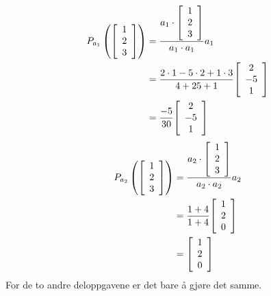 \documentclass[11pt, a4paper, norsk]{NTNUoving}
\newenvironment{pkt}{\begin{punkt}}{\end{punkt}}
\newenvironment{matrise}[1][c]{
        \left[
            \begin{array}{#1}
    }
    {    
    \end{array}
    \right]           
}
\begin{document}
\begin{oppgave}
    \begin{pkt}
        \begin{align*}
            P_{a_1}\left(\begin{matrise}
            1\\2\\3
            \end{matrise}\right)&=\frac{a_1\cdot \begin{matrise}
            1\\2\\3
            \end{matrise}}{a_1\cdot a_1}a_1
            \\&= \frac{2\cdot 1 - 5 \cdot 2 + 1 \cdot 3}{4+25+1}\begin{matrise}
                2\\-5\\1
            \end{matrise}
            \\&=\frac{-5}{30}\begin{matrise}
                2\\-5\\1
            \end{matrise}
        \end{align*}
        \begin{align*}
            P_{a_2}\left(\begin{matrise}
            1\\2\\3
            \end{matrise}\right)&=\frac{a_2\cdot \begin{matrise}
            1\\2\\3
            \end{matrise}}{a_2\cdot a_2}a_2
            \\&= \frac{1+4}{1+4}\begin{matrise}
            1\\2\\0
            \end{matrise}
            \\&=\begin{matrise}
            1\\2\\0
            \end{matrise}
        \end{align*}
        For de to andre deloppgavene er det bare å gjøre det samme. 
    \end{pkt}
\end{oppgave}
\end{document}
